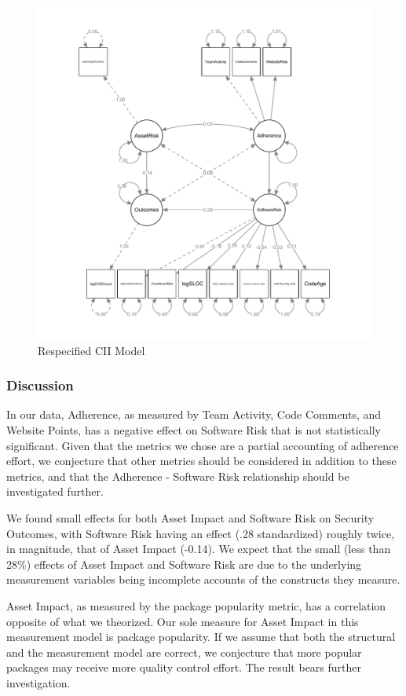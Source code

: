 \begin{figure}
	\centering
	\includegraphics[width=.6\textwidth]{CII_Respecified_SEM_Model.pdf}
	\caption{Respecified CII Model}
	\label{fig:cii_model_respecified_estimates}
\end{figure}

\subsubsection{Discussion}
\label{sec:case_cii_discussion}
In our data, Adherence, as measured by Team Activity, Code Comments, and Website Points, has a negative effect on Software Risk that is not statistically significant. Given that the metrics we chose are a partial accounting of adherence effort, we conjecture that other metrics should be considered in addition to these metrics, and that the Adherence - Software Risk relationship should be investigated further. 

We found small effects for both Asset Impact and Software Risk on Security Outcomes, with Software Risk having an effect (.28 standardized) roughly twice, in magnitude, that of Asset Impact (-0.14). We expect that the small (less than 28\%) effects of Asset Impact and Software Risk are due to the underlying measurement variables being incomplete accounts of the constructs they measure. 

Asset Impact, as measured by the package popularity metric, has a correlation opposite of what we theorized. Our sole measure for Asset Impact in this measurement model is package popularity. If we assume that both the structural and the measurement model are correct, we conjecture that more popular packages may receive more quality control effort. The result bears further investigation.  

